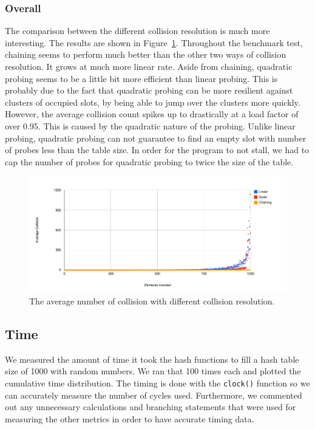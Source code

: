 \documentclass[11pt]{article}
\begin{document}
\subsubsection{Overall}
The comparison between the different collision resolution is much more interesting.
The results are shown in Figure~\ref{fig:collision}.
Throughout the benchmark test, chaining seems to perform much better than the other
two ways of collision resolution. It grows at much more linear rate. 
Aside from chaining, quadratic probing seems to be a little bit more 
efficient than linear probing. This is probably due to the fact that quadratic probing 
can be more resilient against clusters of occupied slots, by being able to jump over
the clusters more quickly. However, the average collision count spikes up to drastically
at a load factor of over 0.95. This is caused by the quadratic nature of the probing. Unlike linear
probing, quadratic probing can not guarantee to find an empty slot with number of probes
less than the table size. In order for the program to not stall, we had to cap the number of probes for quadratic probing to twice the size of the table.

\begin{figure}
        
                \centering
                \includegraphics[width=\textwidth]{collision-all.png}
              \caption{The average number of collision with different collision resolution.}
              \label{fig:collision}
\end{figure}


\subsection{Time}
We measured the amount of time it took the hash functions to fill a hash table
size of 1000 with random numbers. We ran that 100 times each and plotted the
cumulative time distribution. The timing is done with the \texttt{clock()} 
function so we can accurately measure the number of cycles used. 
Furthermore, we commented out any unnecessary calculations and 
branching statements that were used for measuring the other metrics 
in order to have accurate timing data.
\end{document}
